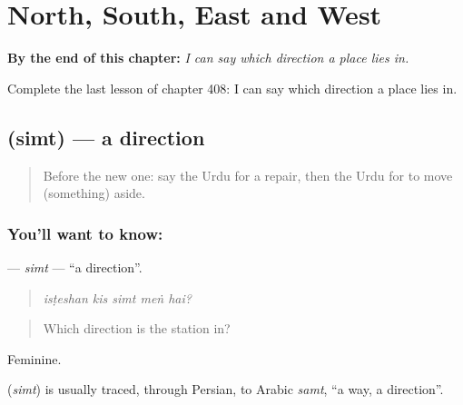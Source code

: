 
\chapter{North, South, East and West}
\label{ch:ur-north-south-east-and-west}

\begin{chapteropening}
\textbf{By the end of this chapter:} \emph{I can say which direction a place lies in.}

Complete the last lesson of chapter 408: I can say which direction a place lies in.
\end{chapteropening}

\section[\texorpdfstring{\ur{سمت} (simt)}{سمت (simt)}]{ (simt) — a direction}

\label{lesson:UR-C408-simt}



\begin{quote}
Before the new one: say the Urdu for a repair, then the Urdu for to move (something) aside.
\end{quote}

\subsection*{You'll want to know: }
\textbf{} — \emph{simt} — \textquotedblleft{}a direction\textquotedblright{}.

\begin{quote}
    
\end{quote}

\begin{quote}
\emph{isṭeshan kis simt meṅ hai?}
\end{quote}

\begin{quote}
Which direction is the station in?
\end{quote}

Feminine.

\begin{cousinweb}
\textbf{} (\emph{simt}) is usually traced, through Persian, to Arabic \emph{samt}, \textquotedblleft{}a way, a direction\textquotedblright{}.
\end{cousinweb}

